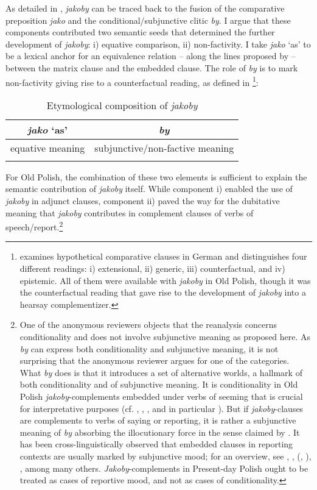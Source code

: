\documentclass[output=paper
,modfonts
,nonflat]{langsci/langscibook}
\begin{document}
As detailed in , \emph{jakoby} can be traced back to the fusion of the comparative preposition \emph{jako} and the conditional\slash subjunctive clitic \emph{by}. I argue that these components contributed two semantic seeds that determined the further development of \emph{jakoby}: i) equative comparison, ii) non-factivity. I take \emph{jako} `as' to be a lexical anchor for an equivalence relation – along the lines proposed by \textcite{Umbach-Gust2014} – between the matrix clause and the embedded clause. The role of \emph{by} is to mark non-factivity giving rise to a counterfactual reading, as defined in \textcite[988]{Bucking2017}\footnote{\textcite{Bucking2017} examines hypothetical comparative clauses in German and distinguishes four different readings: i) extensional, ii) generic, iii) counterfactual, and iv) epistemic. All of them were available with \emph{jakoby} in Old Polish, though it was the counterfactual reading that gave rise to the development of \emph{jakoby} into a hearsay complementizer.
}:

\begin{table}[h]
\begin{tabular}{cc}
 \lsptoprule
 \emph{jako} `as' & \emph{by} \\
\midrule
equative meaning & subjunctive\slash non-factive meaning \\
 \lspbottomrule
\end{tabular}
\caption{Etymological composition of \emph{jakoby}}
\end{table}

\noindent For Old Polish, the combination of these two elements is sufficient to explain the semantic contribution of \emph{jakoby} itself. While component i) enabled the use of \emph{jakoby} in adjunct clauses, component ii) paved the way for the dubitative meaning that \emph{jakoby} contributes in complement clauses of verbs of speech\slash report.\footnote{One of the anonymous reviewers objects that the reanalysis concerns conditionality and does not involve subjunctive meaning as proposed here.  As \emph{by} can express both conditionality and subjunctive meaning, it is not surprising that the anonymous reviewer argues for one of the categories. What \emph{by} does is that it introduces a set of alternative worlds, a hallmark of both conditionality and of subjunctive meaning. It is conditionality in Old Polish \emph{jakoby}-complements embedded under verbs of seeming that is crucial for interpretative purposes (cf. \textcite{Stalnaker1968}, \textcite{Lewis1973}, \textcite{Fintel2011}, and in particular \textcite{Bucking2017}). But if \emph{jakoby}-clauses are complements to verbs of saying or reporting, it is rather a subjunctive meaning of \emph{by} absorbing the illocutionary force in the sense claimed by \textcite{Truckenbrodt2006}. It has been cross-linguistically observed that embedded clauses in reporting contexts are usually marked by subjunctive mood; for an overview, see \textcite{Becker-Remberger2010}, \textcite{Fabricius-Hansen-Saebo2004}, \citeauthor{Portner1997} (\citeyear{Portner1997}, \citeyear{Portner2018}), \textcite{Sode2014}, among many others. \emph{Jakoby}-complements in Present-day Polish ought to be treated as cases of reportive mood, and not as cases of conditionality.
}
\end{document}
